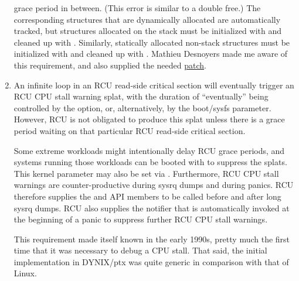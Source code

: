 \begin{enumerate}
   grace period in between.
   (This error is similar to a double free.)
   The corresponding  structures that are dynamically
   allocated are automatically tracked, but  structures
   allocated on the stack must be initialized with
    and cleaned up with
   .
   Similarly, statically allocated
   non-stack  structures must be initialized with
    and cleaned up with .
   Mathieu Desnoyers made me aware of this requirement, and also
   supplied the needed
   \href{https://lore.kernel.org/r/20100319013024.GA28456@Krystal}{patch}.
\item An infinite loop in an RCU read-side critical section will eventually
   trigger an RCU CPU stall warning splat, with the duration of
   ``eventually'' being controlled by the 
    option, or, alternatively, by the
    boot/sysfs parameter.
   However, RCU
   is not obligated to produce this splat unless there is a grace period
   waiting on that particular RCU read-side critical section.

   Some extreme workloads might intentionally delay RCU grace periods,
   and systems running those workloads can be booted with
    to suppress the splats.
   This
   kernel parameter may also be set via . Furthermore, RCU CPU
   stall warnings are counter-productive during sysrq dumps and during
   panics.
   RCU therefore supplies the  and
    API members to be called before and after long
   sysrq dumps.
   RCU also supplies the  notifier that is
   automatically invoked at the beginning of a panic to suppress further
   RCU CPU stall warnings.

   This requirement made itself known in the early 1990s, pretty much
   the first time that it was necessary to debug a CPU stall. That said,
   the initial implementation in DYNIX/ptx was quite generic in
   comparison with that of Linux.


\end{enumerate}
